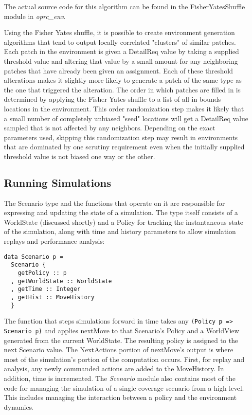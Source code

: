 The actual source code for this algorithm can be found in the FisherYatesShuffle module in \textit{oprc\_env}.

Using the Fisher Yates shuffle, it is possible to create environment generation algorithms that tend to output locally correlated "clusters" of similar patches. Each patch in the environment is given a DetailReq value by taking a supplied threshold value and altering that value by a small amount for any neighboring patches that have already been given an assignment. Each of these threshold alterations makes it slightly more likely to generate a patch of the same type as the one that triggered the alteration. The order in which patches are filled in is determined by applying the Fisher Yates shuffle to a list of all in bounds locations in the environment. This order randomization step makes it likely that a small number of completely unbiased "seed" locations will get a DetailReq value sampled that is not affected by any neighbors. Depending on the exact parameters used, skipping this randomization step may result in environments that are dominated by one scrutiny requirement even when the initially supplied threshold value is not biased one way or the other.

\subsection{Running Simulations}

The Scenario type and the functions that operate on it are responsible for expressing and updating the state of a simulation. The type itself consists of a WorldState (discussed shortly) and a Policy for tracking the instantaneous state of the simulation, along with time and history parameters to allow simulation replays and performance analysis:

\begin{verbatim}
data Scenario p =
  Scenario {
    getPolicy :: p
  , getWorldState :: WorldState
  , getTime :: Integer
  , getHist :: MoveHistory
  }
\end{verbatim}

The function that steps simulations forward in time takes any \verb|(Policy p => Scenario p)| and applies nextMove to that Scenario's Policy and a WorldView generated from the current WorldState. The resulting policy is assigned to the next Scenario value. The NextActions portion of nextMove's output is where most of the simulation's portion of the computation occurs. First, for replay and analysis, any newly commanded actions are added to the MoveHistory. In addition, time is incremented. The \textit{Scenario} module also contains most of the code for managing the simulation of a single coverage scenario from a high level. This includes managing the interaction between a policy and the environment dynamics.

